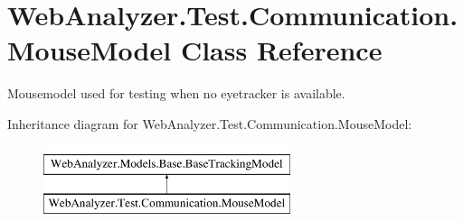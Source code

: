 \hypertarget{class_web_analyzer_1_1_test_1_1_communication_1_1_mouse_model}{}\section{Web\+Analyzer.\+Test.\+Communication.\+Mouse\+Model Class Reference}
\label{class_web_analyzer_1_1_test_1_1_communication_1_1_mouse_model}


Mousemodel used for testing when no eyetracker is available.  


Inheritance diagram for Web\+Analyzer.\+Test.\+Communication.\+Mouse\+Model\+:\begin{figure}[H]
\begin{center}
\leavevmode
\includegraphics[height=2.000000cm]{class_web_analyzer_1_1_test_1_1_communication_1_1_mouse_model}
\end{center}
\end{figure}
